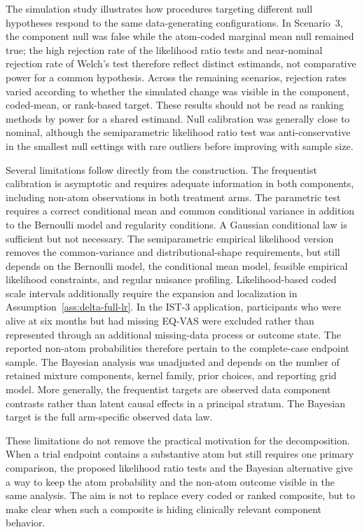 \documentclass[11pt]{article}
\begin{document}
The simulation study illustrates how procedures targeting different null hypotheses respond to the same data-generating configurations. In Scenario~3, the component null was false while the atom-coded marginal mean null remained true; the high rejection rate of the likelihood ratio tests and near-nominal rejection rate of Welch's test therefore reflect distinct estimands, not comparative power for a common hypothesis. Across the remaining scenarios, rejection rates varied according to whether the simulated change was visible in the component, coded-mean, or rank-based target. These results should not be read as ranking methods by power for a shared estimand. Null calibration was generally close to nominal, although the semiparametric likelihood ratio test was anti-conservative in the smallest null settings with rare outliers before improving with sample size.

Several limitations follow directly from the construction. The frequentist calibration is asymptotic and requires adequate information in both components, including non-atom observations in both treatment arms. The parametric test requires a correct conditional mean and common conditional variance in addition to the Bernoulli model and regularity conditions. A Gaussian conditional law is sufficient but not necessary. The semiparametric empirical likelihood version removes the common-variance and distributional-shape requirements, but still depends on the Bernoulli model, the conditional mean model, feasible empirical likelihood constraints, and regular nuisance profiling. Likelihood-based coded scale intervals additionally require the expansion and localization in Assumption~\ref{ass:delta-full-lr}. In the IST-3 application, participants who were alive at six months but had missing EQ-VAS were excluded rather than represented through an additional missing-data process or outcome state. The reported non-atom probabilities therefore pertain to the complete-case endpoint sample. The Bayesian analysis was unadjusted and depends on the number of retained mixture components, kernel family, prior choices, and reporting grid model. More generally, the frequentist targets are observed data component contrasts rather than latent causal effects in a principal stratum. The Bayesian target is the full arm-specific observed data law.

These limitations do not remove the practical motivation for the decomposition. When a trial endpoint contains a substantive atom but still requires one primary comparison, the proposed likelihood ratio tests and the Bayesian alternative give a way to keep the atom probability and the non-atom outcome visible in the same analysis. The aim is not to replace every coded or ranked composite, but to make clear when such a composite is hiding clinically relevant component behavior.
\end{document}
